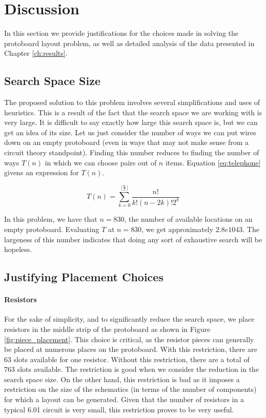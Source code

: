 
\chapter{Discussion}
\label{ch:discussion}

In this section we provide justifications for the choices made in solving the
protoboard layout problem, as well as detailed analysis of the data presented in
Chapter \ref{ch:results}.

\section{Search Space Size}

The proposed solution to this problem involves several simplifications and uses
of heuristics. This is a result of the fact that the search space we are working
with is very large. It is difficult to say exactly how large this search space
is, but we can get an idea of its size. Let us just consider the number of ways
we can put wires down on an empty protoboard (even in ways that may not make
sense
from a circuit theory standpoint). Finding this number reduces to finding the
number of ways $T(n)$ in which we can choose pairs out of $n$ items. Equation
\ref{eq:telephone} givens an expression for $T(n)$.

\begin{equation}
T(n) = \sum_{k = 0}^{\lfloor \frac{n}{2} \rfloor}{\frac{n!}{k! (n - 2k)! 2^k}}
\label{eq:telephone}
\end{equation}

In this problem, we have that $n = 830$, the number of available locations on an
empty protoboard. Evaluating $T$ at $n = 830$, we get approximately $2.8e1043$.
The largeness of this number indicates that doing any sort of exhaustive search
will be hopeless.

\section{Justifying Placement Choices}
\label{sec:justify_placement}

\subsubsection{Resistors}

For the sake of simplicity, and to significantly reduce the search space, we
place resistors in the middle strip of the protoboard as shown in Figure
\ref{fig:piece_placement}. This choice is critical,
as the resistor pieces can generally be placed at numerous places on the
protoboard.
With this restriction, there are $63$ slots available for one resistor. Without
this restriction, there are a total of $763$ slots available. The restriction is
good when we consider the reduction in the search space size. On the other hand,
this restriction is bad as it imposes a restriction on the size of the
schematics (in terms of the number of components) for which a layout can be
generated.
Given that the number
of resistors in a typical 6.01 circuit is very
small, this restriction proves to be very useful.

